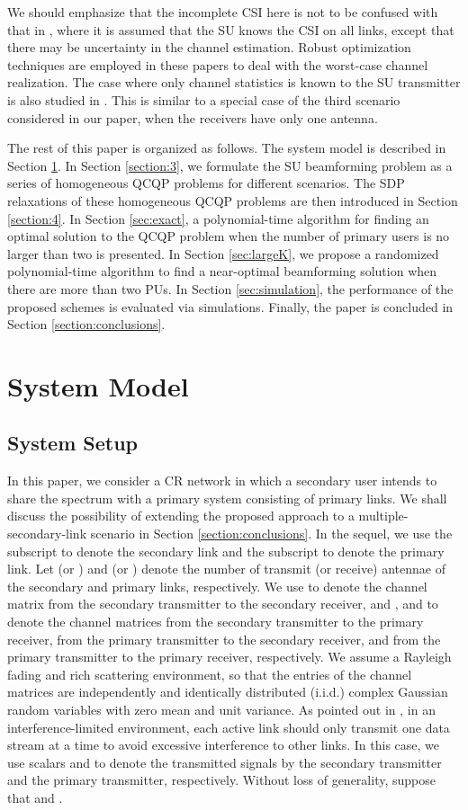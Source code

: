 \documentclass[twocolumn,10pt]{IEEEtran}
\theoremstyle{plain} \newtheorem{theorem}{Theorem}
\theoremstyle{plain} \newtheorem{proposition}{Proposition}
\theoremstyle{plain} \newtheorem{corollary}{Corollary}
\theoremstyle{remark} \newtheorem{remark}{Remark}
\theoremstyle{remark} \newtheorem{lemma}{Lemma}
\theoremstyle{plain} \newtheorem{definition}{Definition}
\theoremstyle{plain} \newtheorem{assumption}{Assumption}
\theoremstyle{plain} \newtheorem{fact}{Fact}
\begin{document}
We should emphasize that the incomplete CSI here is not to be confused with that in \cite{ZLC08,GLM09,PVS+09}, where it is assumed that the SU knows the CSI on all links, except that there may be uncertainty in the channel estimation. Robust optimization techniques are employed in these papers to deal with the worst-case channel realization.  The case where only channel statistics is known to the SU transmitter is also studied in \cite{PVS+09}.  This is similar to a special case of the third scenario considered in our paper, when the receivers have only one antenna.

The rest of this paper is organized as follows. The system model is described in Section \ref{sec:2}. In Section \ref{section:3}, we formulate the SU beamforming problem as a series of homogeneous QCQP problems for different scenarios. The SDP relaxations of these homogeneous QCQP problems are then introduced in Section \ref{section:4}.  In Section \ref{sec:exact}, a polynomial-time algorithm for finding an optimal solution to the QCQP problem when the number of primary users is no larger than two is presented. In Section \ref{sec:largeK}, we propose a randomized polynomial-time algorithm to find a near-optimal beamforming solution when there are more than two PUs.  In Section \ref{sec:simulation}, the performance of the proposed schemes is evaluated via simulations. Finally, the paper is concluded in Section \ref{section:conclusions}.

\section{System Model}\label{sec:2}
\subsection{System Setup}
In this paper, we consider a CR network in which a secondary user intends to share the spectrum with a primary system consisting of  primary links.  We shall discuss the possibility of extending the proposed approach to a multiple-secondary-link scenario in Section \ref{section:conclusions}. In the sequel, we use the subscript  to denote the secondary link and the subscript  to denote the  primary link. Let  (or ) and  (or ) denote the number of transmit (or receive) antennae of the secondary and primary links, respectively.  We use  to denote the channel matrix from the secondary transmitter to the secondary receiver, and ,  and  to denote the channel matrices from the secondary transmitter to the  primary receiver, from the  primary transmitter to the secondary receiver, and from the  primary transmitter to the  primary receiver, respectively. We assume a Rayleigh fading and rich scattering environment, so that the entries of the channel matrices are independently and identically distributed (i.i.d.) complex Gaussian random variables with zero mean and unit variance. As pointed out in \cite{B03, MZSY08}, in an interference-limited environment, each active link should only transmit one data stream at a time to avoid excessive interference to other links. In this case, we use scalars  and  to denote the transmitted signals by the secondary transmitter and the  primary transmitter, respectively. Without loss of generality, suppose that  and .
\end{document}
